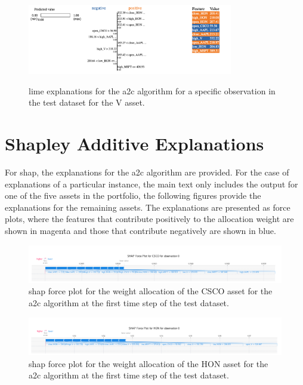 \begin{figure}
    \centering
    \includegraphics[width=0.8\textwidth]{figures/a2c_lime_v.png}
    \label{fig:a2c_lime_v}
    \caption{\acrshort{lime} explanations for the \acrshort{a2c} algorithm for a specific observation in the test dataset for the V asset.}
\end{figure}

\section{Shapley Additive Explanations} \label{app:shap_explanations}

For \acrshort{shap}, the explanations for the \acrshort{a2c} algorithm are provided. For the case of explanations of a particular instance, the main text only includes the output for one of the five assets in the portfolio, the following figures provide the explanations for the remaining assets. The explanations are presented as force plots, where the features that contribute positively to the allocation weight are shown in magenta and those that contribute negatively are shown in blue.

\begin{figure}
    \centering
    \includegraphics[width=\textwidth]{figures/a2c_shap_forceplot_singleobs_csco.png}
    \caption{\acrshort{shap} force plot for the weight allocation of the CSCO asset for the \acrshort{a2c} algorithm at the first time step of the test dataset.}
    \label{fig:a2c_shap_forceplot_singleobs_csco}
\end{figure}

\begin{figure}
    \centering
    \includegraphics[width=\textwidth]{figures/a2c_shap_forceplot_singleobs_hon.png}
    \caption{\acrshort{shap} force plot for the weight allocation of the HON asset for the \acrshort{a2c} algorithm at the first time step of the test dataset.}
    \label{fig:a2c_shap_forceplot_singleobs_hon}
\end{figure}

